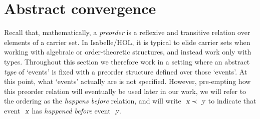 \section{Abstract convergence}
\label{sect.abstract.convergence}

Recall that, mathematically, a \emph{preorder} is a reflexive and transitive relation over elements of a carrier set.
In Isabelle/HOL, it is typical to elide carrier sets when working with algebraic or order-theoretic structures, and instead work only with types.
Throughout this section we therefore work in a setting where an abstract \emph{type} of `events' is fixed with a preorder structure defined over those `events'.
At this point, what `events' actually are is not specified.
However, pre-empting how this preorder relation will eventually be used later in our work, we will refer to the ordering as the \emph{happens before} relation, and will write $\isa{x} \prec \isa{y}$ to indicate that event $\isa{x}$ has \emph{happened before} event $\isa{y}$.

